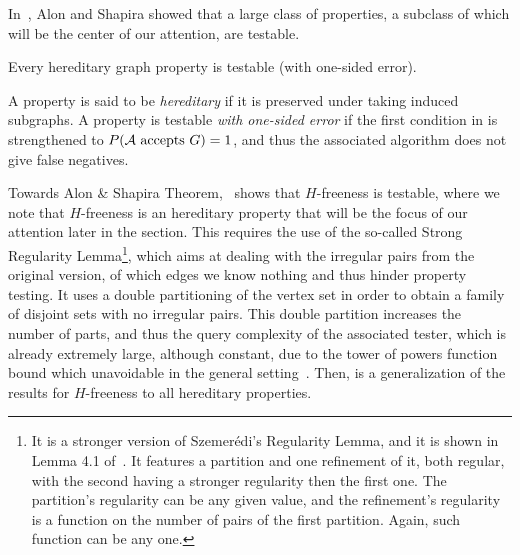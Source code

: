     In~\cite{a_characterization_of_the_natural_graph_properties_testable_with_one_sided_error}, Alon and Shapira
    showed that a large class of properties, a subclass of which will be the center of our attention, are testable.

    \begin{theorem}
        \label{thm:alon_and_shapira_theorem}
        Every hereditary graph property is testable (with one-sided error).
    \end{theorem}

    A property is said to be \emph{hereditary} if it is preserved under taking induced subgraphs.
    A property is testable \emph{with one-sided error} if the first condition in 
    is strengthened to $P( \mathcal{A} \text{ accepts } G ) = 1$, and thus the associated algorithm does
    not give false negatives.

    Towards Alon \& Shapira Theorem,~\cite{efficient_testing_of_large_graphs} shows that $H$-freeness is testable, where
    we note that $H$-freeness is an hereditary property that will be the focus of our attention later in the section.
    This requires the use of the so-called Strong Regularity Lemma\footnote{It is a
        stronger version of Szemer\'edi's Regularity Lemma, and it is shown in Lemma 4.1 of~\cite{efficient_testing_of_large_graphs}.
        It features a partition and one refinement of it, both regular,
        with the second having a stronger regularity then the first one.
        The partition's regularity can be any given value, and the refinement's regularity is a function
        on the number of pairs of the first partition.
        Again, such function can be any  one.},
    which aims at dealing with the irregular
    pairs from the original version, of which edges we know nothing and thus hinder property testing.
    It uses a double partitioning of the vertex set in order to obtain a family of disjoint sets
    with no irregular pairs.
    This double partition increases the number of parts, and thus the query complexity of the associated tester, which
    is already extremely large, although constant, due to the tower of powers function bound which unavoidable in the
    general setting~\cite{lower_bounds_of_tower_type_for_szeremedis_uniformity_lemma}.
    Then,  is a generalization of the results for $H$-freeness to all
    hereditary properties.

